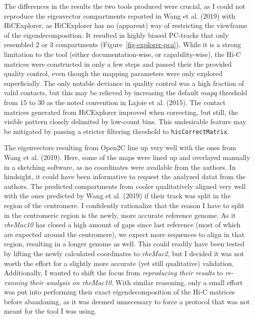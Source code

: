 \documentclass[
  11pt,
  a4paper,
]{scrbook}
\begin{document}
The differences in the results the two tools produced were crucial, as I
could not reproduce the eigenvector compartments reported in Wang et al.
(2019) with HiCExplorer, as HiCExplorer has no (apparent) way of
restricting the viewframe of the eigendecomposition. It resulted in
highly biased PC-tracks that only resembled 2 or 3 compartments
(Figure~\ref{fig-explorer-pca}). While it is a strong limitation to the
tool (either documentation-wise, or capability-wise), the Hi-C matrices
were constructed in only a few steps and passed their the provided
quality control, even though the mapping parameters were only explored
superficially. The only notable deviance in quality control was a high
fraction of valid contacts, but this may be relieved by increasing the
default \(mapq\) threshold from \(15\) to \(30\) as the noted convention
in Lajoie et al. (2015). The contact matrices generated from HiCExplorer
improved when correcting, but still, the visible pattern closely
delimited by low-count bins. This undesirable feature may be mitigated
by passing a stricter filtering threshold to \texttt{hicCorrectMatrix}.

The eigenvectors resulting from Open2C line up very well with the ones
from Wang et al. (2019). Here, some of the maps were lined up and
overlayed manually in a sketching software, as no coordinates were
available from the authors. In hindsight, it could have been informative
to request the analyzed datat from the authors. The predicted
compartments from cooler qualitatively aligned very well with the ones
predicted by Wang et al. (2019) if their track was split in the region
of the centromere. I confidently rationalize that the reason I have to
split in the centromeric region is the newly, more accurate reference
genome. As it \emph{rheMac10} has closed a high amount of gaps since
last reference (most of which are expected around the centromere), we
expect more sequences to align in that region, resulting in a longer
genome as well. This could readily have been tested by lifting the newly
calculated coordinates to \emph{rheMac2}, but I decided it was not worth
the effort for a slightly more accurate (yet still qualitative)
validation. Additionally, I wanted to shift the focus from
\emph{reproducing their results} to \emph{re-running their analysis on
rheMac10}. With similar reasoning, only a small effort was put into
performing their exact eigendecomposition of the Hi-C matrices before
abandoning, as it was deemed unnecessary to force a protocol that was
not meant for the tool I was using.
\end{document}
